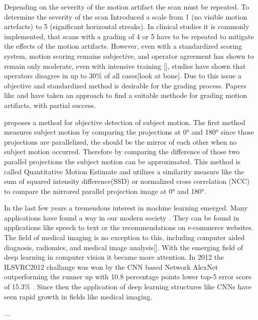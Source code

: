 \documentclass[
a4paper, 
12pt,
grayscalebody, %
abstract=on,
twoside, BCOR10mm, 12pt, DIV13,headinclude, footexclude, final, abstracton, openright
]{ibireprt}
\numberwithin{equation}{chapter}
\numberwithin{table}{chapter}
\numberwithin{figure}{chapter}
\numberwithin{algorithm}{chapter}
\numberwithin{example}{chapter}
\numberwithin{example}{chapter}
\begin{document}
 Depending on the severity of the motion artifact the scan must be repeated. To determine the severity of the scan \cite{Whittier2020} Introduced a scale from 1 (no visible motion artefacts) to 5 (significant horizontal streaks). In clinical studies it is commonly implemented, that scans with a grading of 4 or 5 have to be repeated to mitigate the effects of the motion artifacts. However, even with a standardized scoring system, motion scoring remains subjective, and operator agreement has shown to remain only moderate, even with intensive training [], studies have shown that operators disagree in up to 30\% of all cases[look at bone]. Due to this issue a objective and standardized method is desirable for the grading process. Papers like \cite{Sode2011} and \cite{Walle2023} have taken an approach to find a suitable methode for grading motion artifacts, with partial success.
 
\cite{Walle2023} proposes a method for objective detection of subject motion. The first method measures subject motion by comparing the projections at 0° and 180° since those projections are parallelized, the should be the mirror of each other when no subject motion occurred. Therefore by comparing the difference of those two parallel projections the subject motion can be approximated. This method is called Quantitative Motion Estimate and utilizes a similarity measure like the sum of squared intensity difference(SSD) or normalized cross correlation (NCC) to compare the mirrored parallel projection image at 0° and 180°.%

In the last few years a tremendous interest in machine learning emerged. Many applications have found a way in our modern society \cite{LeCun2015}. They can be found in applications like speech to text or the recommendations on e-commerce websites. The field of medical imaging is no exception to this, including computer aided diagnosis, radiomics, and medical image analysis[]. With the emerging field of deep learning in computer vision it became more attention. In 2012 the ILSVRC2012 challange  was won by the CNN based Network AlexNet outperforming the runner up with 10.8 percentage points lower top-5 error score of 15.3\% . Since then the application of deep learning structures like CNNs have seen rapid growth in fields like medical imaging. 

 ...\cite{Yamashita2018} %
\end{document}
